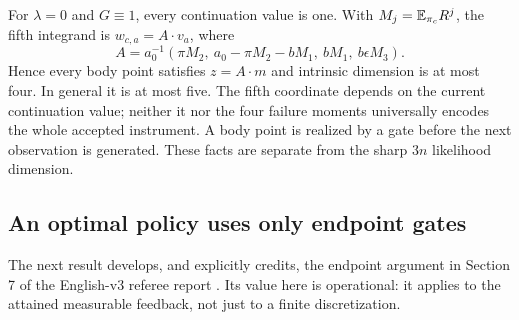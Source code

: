 \begin{remark}\label{rem:dimension}
For $\lambda=0$ and $G\equiv1$, every continuation value is one. With $M_j=\mathbb E_{\pi_c}R^j$, the fifth integrand is $w_{c,a}=A\cdot v_a$, where
\[
 A=a_0^{-1}(\pi M_2,\ a_0-\pi M_2-bM_1,\ bM_1,\ b\epsilon M_3).
\]
Hence every body point satisfies $z=A\cdot m$ and intrinsic dimension is at most four. In general it is at most five. The fifth coordinate depends on the current continuation value; neither it nor the four failure moments universally encodes the whole accepted instrument. A body point is realized by a gate before the next observation is generated. These facts are separate from the sharp $3n$ likelihood dimension.
\end{remark}

\subsection{An optimal policy uses only endpoint gates}
The next result develops, and explicitly credits, the endpoint argument in Section 7 of the English-v3 referee report \cite{RefereeV3}. Its value here is operational: it applies to the attained measurable feedback, not just to a finite discretization.


